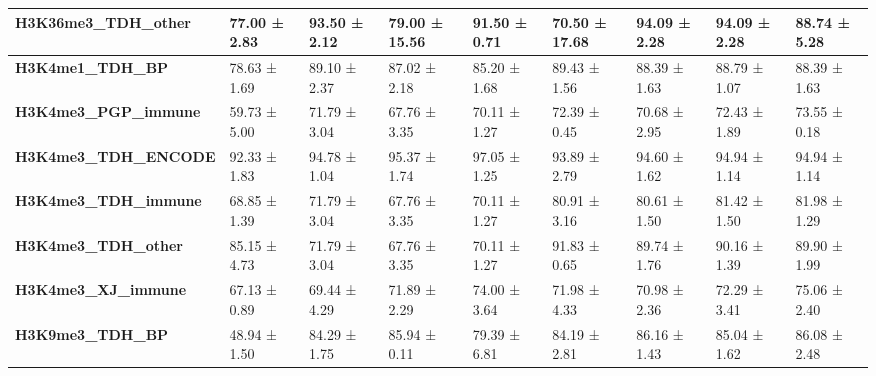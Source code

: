 \documentclass[12pt]{article}
\begin{document}
\begin{table}
\begin{tabular}{|lllllllll|}
\textbf{H3K36me3\_TDH\_other}          & 77.00 ± 2.83                           & 93.50 ± 2.12                         & 79.00 ± 15.56                      & 91.50 ± 0.71                               & 70.50 ± 17.68                       & 94.09 ± 2.28                        & {\color[HTML]{CB0000} 94.09 ± 2.28} & 88.74 ± 5.28                        \\ \hline
\textbf{H3K4me1\_TDH\_BP}              & 78.63 ± 1.69                           & 89.10 ± 2.37                         & 87.02 ± 2.18                       & 85.20 ± 1.68                               & {\color[HTML]{CB0000} 89.43 ± 1.56} & 88.39 ± 1.63                        & 88.79 ± 1.07                        & 88.39 ± 1.63                        \\ \hline
\textbf{H3K4me3\_PGP\_immune}          & 59.73 ± 5.00                           & 71.79 ± 3.04                         & 67.76 ± 3.35                       & 70.11 ± 1.27                               & 72.39 ± 0.45                        & 70.68 ± 2.95                        & 72.43 ± 1.89                        & {\color[HTML]{CB0000} 73.55 ± 0.18} \\ \hline
\textbf{H3K4me3\_TDH\_ENCODE}          & 92.33 ± 1.83                           & 94.78 ± 1.04                         & 95.37 ± 1.74                       & {\color[HTML]{CB0000} 97.05 ± 1.25}        & 93.89 ± 2.79                        & 94.60 ± 1.62                        & 94.94 ± 1.14                        & 94.94 ± 1.14                        \\ \hline
\textbf{H3K4me3\_TDH\_immune}          & 68.85 ± 1.39                           & 71.79 ± 3.04                         & 67.76 ± 3.35                       & 70.11 ± 1.27                               & 80.91 ± 3.16                        & 80.61 ± 1.50                        & 81.42 ± 1.50                        & {\color[HTML]{CB0000} 81.98 ± 1.29} \\ \hline
\textbf{H3K4me3\_TDH\_other}           & 85.15 ± 4.73                           & 71.79 ± 3.04                         & 67.76 ± 3.35                       & 70.11 ± 1.27                               & {\color[HTML]{CB0000} 91.83 ± 0.65} & 89.74 ± 1.76                        & 90.16 ± 1.39                        & 89.90 ± 1.99                        \\ \hline
\textbf{H3K4me3\_XJ\_immune}           & 67.13 ± 0.89                           & 69.44 ± 4.29                         & 71.89 ± 2.29                       & 74.00 ± 3.64                               & 71.98 ± 4.33                        & 70.98 ± 2.36                        & 72.29 ± 3.41                        & {\color[HTML]{CB0000} 75.06 ± 2.40} \\ \hline
\textbf{H3K9me3\_TDH\_BP}              & 48.94 ± 1.50                           & 84.29 ± 1.75                         & 85.94 ± 0.11                       & 79.39 ± 6.81                               & 84.19 ± 2.81                        & {\color[HTML]{CB0000} 86.16 ± 1.43} & 85.04 ± 1.62                        & 86.08 ± 2.48                        \\ \hline


\end{tabular}
\end{table}
\end{document}
